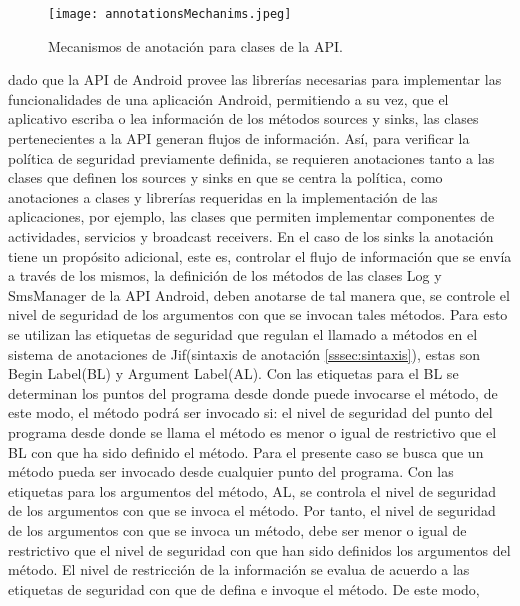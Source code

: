 \begin{figure}[t!]
	\begin{center}
	\texttt{[image: annotationsMechanims.jpeg]}
	\end{center}
	\caption{Mecanismos de anotación para clases de la API.}
	\label{fig:annotationsMechanims}  
\end{figure}
dado que la API de Android provee las librerías necesarias para implementar las
funcionalidades de una aplicación Android, permitiendo a su vez, que el
aplicativo escriba o lea información de los métodos sources y sinks, las clases
pertenecientes a la API generan flujos de información. Así, para verificar la
política de seguridad previamente definida, se requieren anotaciones tanto a las
clases que definen los sources y sinks en que se centra la política, como
anotaciones a clases y librerías requeridas en la implementación de las
aplicaciones, por ejemplo, las clases que permiten implementar componentes
de actividades, servicios y broadcast receivers.\newline 
En el caso de los sinks la anotación tiene un propósito adicional, este es,
controlar el flujo de información que se envía a través de los mismos, la
definición de los métodos de las clases Log y SmsManager de la API Android,
deben anotarse de tal manera que, se controle el nivel de seguridad de los
argumentos con que se invocan tales métodos.\newline 
Para esto se utilizan las etiquetas de seguridad que regulan el llamado a
métodos en el sistema de anotaciones de Jif(sintaxis de anotación
\ref{sssec:sintaxis}), estas son Begin Label(BL) y Argument Label(AL).
Con las etiquetas para el BL se determinan los puntos del programa desde donde
puede invocarse el método, de este modo, el método podrá ser invocado si: el
nivel de seguridad del punto del programa desde donde se llama el método es
menor o igual de restrictivo que el BL con que ha sido definido el método. Para
el presente caso se busca que un método pueda ser invocado desde cualquier punto
del programa.\newline
Con las etiquetas para los argumentos del método, AL, se controla el nivel de
seguridad de los argumentos con que se invoca el método. Por tanto, el nivel de
seguridad de los argumentos con que se invoca un método, debe ser menor o igual
de restrictivo que el nivel de seguridad con que han sido definidos los
argumentos del método.\newline
El nivel de restricción de la información se evalua de acuerdo a las
etiquetas de seguridad con que de defina e invoque el método. De este modo,
